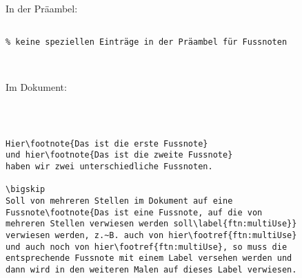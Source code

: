 
In der Präambel:

\begin{verbatim}

% keine speziellen Einträge in der Präambel für Fussnoten



\end{verbatim}

\tcblower

Im Dokument: 

\begin{verbatim}



Hier\footnote{Das ist die erste Fussnote} 
und hier\footnote{Das ist die zweite Fussnote} 
haben wir zwei unterschiedliche Fussnoten.

\bigskip 
Soll von mehreren Stellen im Dokument auf eine 
Fussnote\footnote{Das ist eine Fussnote, auf die von 
mehreren Stellen verwiesen werden soll\label{ftn:multiUse}}
verwiesen werden, z.~B. auch von hier\footref{ftn:multiUse} 
und auch noch von hier\footref{ftn:multiUse}, so muss die
entsprechende Fussnote mit einem Label versehen werden und 
dann wird in den weiteren Malen auf dieses Label verwiesen.



\end{verbatim}

